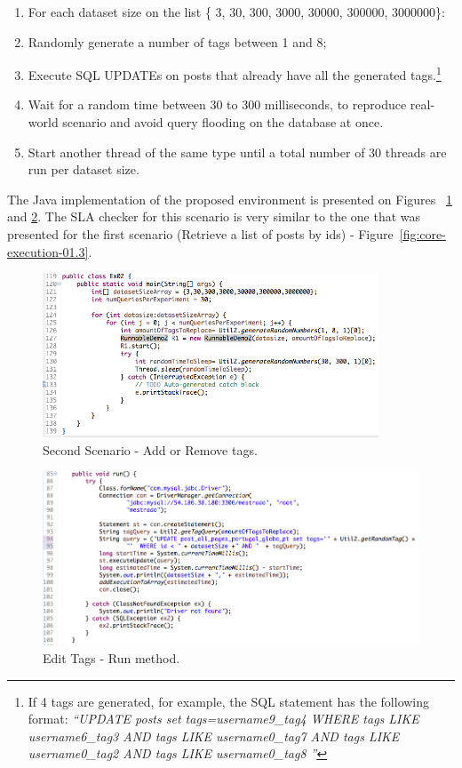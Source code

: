 \begin{enumerate}
\item{For each dataset size on the list \{ 3, 30, 300, 3000, 30000, 300000, 3000000\}:}
\item{Randomly generate a number of tags between 1 and 8;}
\item{Execute SQL UPDATEs on posts that already have all the generated tags.\footnote{If 4 tags are generated, for example, the SQL statement has the following format: \textit{``UPDATE posts set tags=username9\_tag4 WHERE tags LIKE username6\_tag3 AND tags LIKE username0\_tag7 AND tags LIKE username0\_tag2 AND tags LIKE username0\_tag8 ''}}}
\item{Wait for a random time between 30 to 300 milliseconds, to reproduce real-world scenario and avoid	query flooding on the database at once.}
\item{Start another thread of the same type until a total number of 30 threads are run per dataset size.}
\end{enumerate}

The Java implementation of the proposed environment is presented on Figures ~\ref{fig:tags-java-01} and \ref{fig:tags-java-02}. The SLA checker for this scenario is very similar to the one that was presented for the first scenario (Retrieve a list of posts by ids) - Figure~\ref{fig:core-execution-01.3}.


\begin{figure}[ht!]
\centering
\includegraphics[width=100mm]{Imagens/tags-java-01.png}
\caption{Second Scenario - Add or Remove tags.\label{fig:tags-java-01}}
\end{figure}

\begin{figure}[ht!]
\centering
\includegraphics[width=150mm]{Imagens/tags-java-02.png}
\caption{Edit Tags - Run method.\label{fig:tags-java-02}}
\end{figure}

